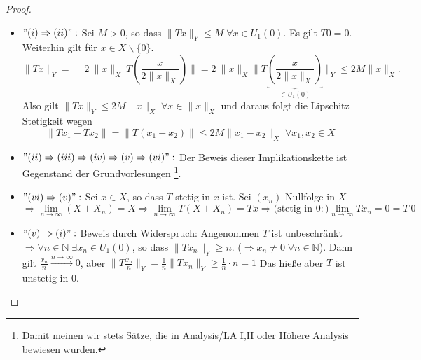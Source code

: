 \documentclass[ngerman]{report}
\theoremstyle{definition}%
\theoremstyle{myStyle}
\theoremstyle{plain}%
\newcommand{\N}{\mathbb{N}}
\newcommand{\norm}[1]{\|#1\|}
\newcommand{\df}{\Rightarrow} %
\newcommand{\U}[2][1]{U_{#1}(#2)} %
\newcommand{\EK}{\U{0}} %
\newcommand{\limes}[1][\infty]{\lim_{n \to #1}}
\begin{document}
	\begin{proof}
		\begin{itemize}[]
			\item $"(i) \df (ii)":$ 
				Sei $M > 0$, so dass $\norm{Tx}_Y \leq M \; \forall x \in U_1(0)$. Es gilt $T0 = 0$.
				Weiterhin gilt für $x \in X\backslash \{0\}$. 
				$$\norm{Tx}_Y = \norm{\: 2 \: \norm{x}_X \: T\left(\frac{x}{2 \norm{x}_X}\right)}
			  =	2 \: \norm{x}_X\norm{T\underbrace{\left(\frac{x}{2 \norm{x}_X}\right)}_{\in \EK}}_Y
				\leq 2 M \norm{x}_X.$$
				Also gilt $\norm{Tx}_Y \leq 2M \norm{x}_X \; \forall x \in \norm{x}_X$ 
				und daraus folgt die Lipschitz Stetigkeit wegen 
				$$ \norm{Tx_1 - Tx_2} = \norm{ T(x_1 - x_2)} \leq 2 M \norm{x_1 - x_2}_X \; \forall x_1, x_2\in X$$ 
											
			\item $"(ii) \df (iii) \df (iv) \df (v) \df (vi)":$ 
				Der Beweis dieser Implikationskette ist Gegenstand der Grundvorlesungen \footnote{Damit meinen wir stets Sätze, die in Analysis\slash LA I,II oder Höhere Analysis bewiesen wurden.}.
				
			\item $"(vi) \df (v)":$ 
				Sei $x \in X$, so dass $T$ stetig in $x$ ist. Sei $(x_n)$ Nullfolge in $X$
				$$\df \limes (X + X_n) = X \df \limes T(X+X_n) = Tx 
				\df \text{(stetig in 0}:)\limes T x_n = 0 = T\:0$$ 

			\item $"(v) \df (i)":$ Beweis durch Widerspruch:
				Angenommen $T$ ist unbeschränkt $\df \forall n \in \N \; \exists x_n \in \EK$, so dass
				$\norm{Tx_n}_Y \geq n.$ ($\df x_n \not = 0 \; \forall n\in\N$). 
				Dann gilt $\frac{x_n}{n} \overset{n\to\infty}{\longrightarrow} 0$,
				aber $\norm{T\frac{x_n}{n}}_Y = \frac{1}{n} \norm{T x_n}_Y \geq \frac{1}{n} \cdot n = 1$
				Das hieße aber $T$ ist unstetig in 0. 

		\end{itemize}
	\end{proof}
\end{document}
